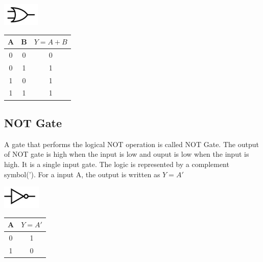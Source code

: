 \documentclass[a4paper, 12pt]{article}
\begin{document}
\begin{minipage}[c]{.5\textwidth}
  \centering
    \includegraphics{or-gate}
\end{minipage}
\begin{minipage}{.5\textwidth}
  \begin{center}
    \begin{tabular}{ |c|c|c| }
      \hline
      A & B & $Y = A+B$ \\
      \hline
      0 & 0 & 0 \\
      \hline
      0 & 1 & 1 \\
      \hline
      1 & 0 & 1 \\
      \hline
      1 & 1 & 1 \\
      \hline
    \end{tabular}
  \end{center}
\end{minipage}



\subsection{NOT Gate}
A gate that performs the logical NOT operation is called NOT Gate. The output of NOT gate is high when the input is low and ouput is low when the input is high. It is a single input gate. The logic is represented by a complement symbol('). For a input A, the output is written as $Y = A'$

\begin{minipage}[c]{.5\textwidth}
  \centering
    \includegraphics{not-gate}
\end{minipage}
\begin{minipage}{.5\textwidth}
  \begin{center}
    \begin{tabular}{ |c|c| }
      \hline
      A & $Y = A'$ \\
      \hline
      0 &  1 \\
      \hline
      1 &  0 \\
      \hline
    \end{tabular}
  \end{center}
\end{minipage}
\end{document}

